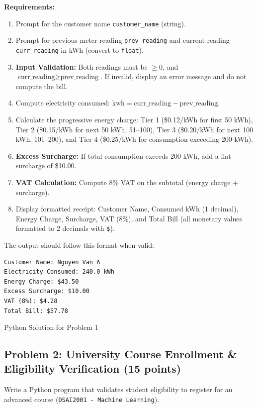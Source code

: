 \documentclass[11pt,a4paper]{article}
\begin{document}
\textbf{Requirements:}
\begin{enumerate}[leftmargin=2em,label=\arabic*.,itemsep=1pt]
  \item Prompt for the customer name \texttt{customer\_name} (string).
  \item Prompt for previous meter reading \texttt{prev\_reading} and current reading \texttt{curr\_reading} in kWh (convert to \texttt{float}).
  \item \textbf{Input Validation:} Both readings must be $\ge 0$, and $\text{curr\_reading} \ge \text{prev\_reading}$. If invalid, display an error message and do not compute the bill.
  \item Compute electricity consumed: $\text{kwh} = \text{curr\_reading} - \text{prev\_reading}$.
  \item Calculate the progressive energy charge: Tier 1 (\$0.12/kWh for first 50 kWh), Tier 2 (\$0.15/kWh for next 50 kWh, 51--100), Tier 3 (\$0.20/kWh for next 100 kWh, 101--200), and Tier 4 (\$0.25/kWh for consumption exceeding 200 kWh).
  \item \textbf{Excess Surcharge:} If total consumption exceeds 200 kWh, add a flat surcharge of \$10.00.
  \item \textbf{VAT Calculation:} Compute 8\% VAT on the subtotal (energy charge + surcharge).
  \item Display formatted receipt: Customer Name, Consumed kWh (1 decimal), Energy Charge, Surcharge, VAT (8\%), and Total Bill (all monetary values formatted to 2 decimals with \texttt{\$}).
\end{enumerate}

The output should follow this format when valid:
\begin{lstlisting}
Customer Name: Nguyen Van A
Electricity Consumed: 240.0 kWh
Energy Charge: $43.50
Excess Surcharge: $10.00
VAT (8%): $4.28
Total Bill: $57.78
\end{lstlisting}

\begin{answerbox}[height=12.2cm]{Python Solution for Problem 1}
\end{answerbox}

\newpage


\subsection*{Problem 2: University Course Enrollment \& Eligibility Verification (15 points)}
Write a Python program that validates student eligibility to register for an advanced course (\texttt{DSAI2001 - Machine Learning}).
\end{document}

